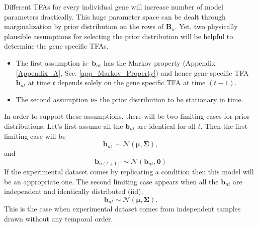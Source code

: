 Different TFAs for every individual gene will increase number of model parameters drastically. This huge parameter space can be dealt through marginalization by prior distribution on the rows of $\textbf{B}_n$. Yet, 
two physically plausible assumptions for selecting the prior distribution will be helpful to determine the gene specific TFAs. 
\begin{itemize}
 \item The first assumption is- $\textbf{b}_{nt}$ has the Markov property (Appendix \ref{Appendix_A}, Sec. \ref{app_Markov_Property}) and hence gene specific TFA $\textbf{b}_{nt} $ at time $t$ depends solely on the gene specific TFA at time $(t-1)$.
 \item The second assumption is- the prior distribution to be stationary in time.
\end{itemize}

In order to support these assumptions, there will be two limiting cases for prior distributions. Let's first assume all the $\textbf{b}_{nt}$ are identical for all $t$. Then the first limiting case will be
\begin{equation} \label{eq:limit_one_a}
   \textbf{b}_{n1} \sim \mathcal{N} ( \boldsymbol{\mu},\boldsymbol{\Sigma}), 
\end{equation}
and
\begin{equation} \label{eq:limit_one_b}
   \textbf{b}_{n(t+1)} \sim \mathcal{N} ( \textbf{b}_{nt},\textbf{0})
\end{equation}
If the experimental dataset comes by replicating a condition then this model will be an appropriate one. The second limiting case appears when all the $\textbf{b}_{nt}$ are independent and identically distributed (iid),
\begin{equation} \label{eq:limit_two}
   \textbf{b}_{nt}\sim \mathcal{N} ( \boldsymbol{\mu},\boldsymbol{\Sigma}).
\end{equation}
This is the case when experimental dataset comes from independent samples drawn without any temporal order.

